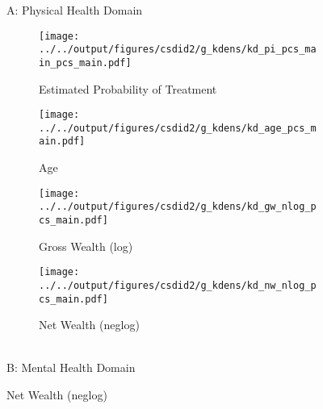 \begin{figure}[htb!]
    \renewcommand{\thesubfigure}{A.\alph{subfigure}}
    \centering \setcounter{subfigure}{0}%
    A: Physical Health Domain
    \\ %
    \begin{subfigure}{0.425\textwidth}
        \caption{Estimated Probability of Treatment}
        \texttt{[image: ../../output/figures/csdid2/g\_kdens/kd\_pi\_pcs\_main\_pcs\_main.pdf]}
        \label{sfig:kd_pi_mcs_main_pcs_main}
    \end{subfigure}
    \begin{subfigure}{0.425\textwidth}
        \caption{Age}
        \texttt{[image: ../../output/figures/csdid2/g\_kdens/kd\_age\_pcs\_main.pdf]}
        \label{sfig:kd_age_pcs_main}    
    \end{subfigure}
    \begin{subfigure}{0.425\textwidth}
        \caption{Gross Wealth (log)}
        \texttt{[image: ../../output/figures/csdid2/g\_kdens/kd\_gw\_nlog\_pcs\_main.pdf]}
        \label{sfig:kd_gw_nlog_pcs_main}
    \end{subfigure}
    \begin{subfigure}{0.425\textwidth}
        \caption{Net Wealth (neglog)}
        \texttt{[image: ../../output/figures/csdid2/g\_kdens/kd\_nw\_nlog\_pcs\_main.pdf]}
        \label{sfig:kd_nw_nlog_pcs_main}
    \end{subfigure}
    \centering  
    \renewcommand{\thesubfigure}{B.\alph{subfigure}}
    \centering \\ \setcounter{subfigure}{0}%
    B: Mental Health Domain
    \\ %

\end{figure}
